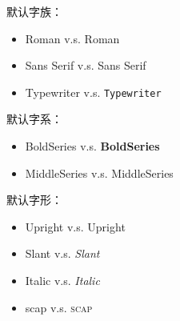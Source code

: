 \documentclass[twoside]{ctexart}
\begin{document}
            默认字族：\familydefault %
            \begin{itemize}
                \item Roman v.s. \textrm{Roman} %
                \item Sans Serif v.s. \textsf{Sans Serif} %
                \item Typewriter v.s. \texttt{Typewriter} %
            \end{itemize}
        
            默认字系：\seriesdefault %
            \begin{itemize}
                \item BoldSeries v.s. \textbf{BoldSeries} %
                \item MiddleSeries v.s. \textmd{MiddleSeries} %
            \end{itemize}

            默认字形：\shapedefault 
            \begin{itemize}
                \item Upright v.s. \textup{Upright} %
                \item Slant v.s. \textsl{Slant} %
                \item Italic v.s. \textit{Italic} %
                \item scap v.s. \textsc{scap} %
            \end{itemize}

\end{document}
